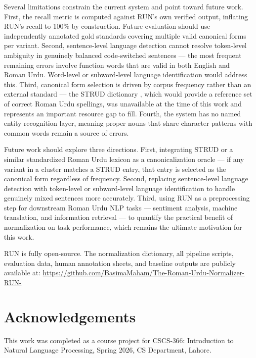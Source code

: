 \documentclass[11pt]{article}
\begin{document}
Several limitations constrain the current system and point toward future work. First, the recall metric is computed against RUN's own verified output, inflating RUN's recall to 100\% by construction. Future evaluation should use independently annotated gold standards covering multiple valid canonical forms per variant. Second, sentence-level language detection cannot resolve token-level ambiguity in genuinely balanced code-switched sentences — the most frequent remaining errors involve function words that are valid in both English and Roman Urdu. Word-level or subword-level language identification would address this. Third, canonical form selection is driven by corpus frequency rather than an external standard — the STRUD dictionary \cite{tasadduq2022strud}, which would provide a reference set of correct Roman Urdu spellings, was unavailable at the time of this work and represents an important resource gap to fill. Fourth, the system has no named entity recognition layer, meaning proper nouns that share character patterns with common words remain a source of errors.

Future work should explore three directions. First, integrating STRUD or a similar standardized Roman Urdu lexicon as a canonicalization oracle — if any variant in a cluster matches a STRUD entry, that entry is selected as the canonical form regardless of frequency. Second, replacing sentence-level language detection with token-level or subword-level language identification to handle genuinely mixed sentences more accurately. Third, using RUN as a preprocessing step for downstream Roman Urdu NLP tasks — sentiment analysis, machine translation, and information retrieval — to quantify the practical benefit of normalization on task performance, which remains the ultimate motivation for this work.

RUN is fully open-source. The normalization dictionary, all pipeline 
scripts, evaluation data, human annotation sheets, and baseline outputs 
are publicly available at: \url{https://github.com/BasimaMaham/The-Roman-Urdu-Normalizer-RUN-}


\section*{Acknowledgements}
This work was completed as a course project for CSCS-366: 
Introduction to Natural Language Processing, Spring 2026, 
CS Department, Lahore.




\end{document}
